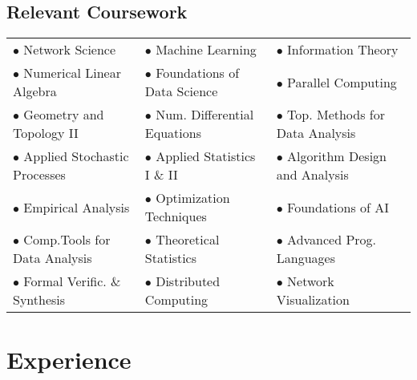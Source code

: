 \documentclass[11pt,a4paper,sans]{moderncv} %
\begin{document}
\subsection{Relevant Coursework}
\begin{center}
\begin{tabularx}{\linewidth}{ X X X }
 $\bullet$ Network Science &  $\bullet$ Machine Learning & $\bullet$ Information Theory  \\ 
  $\bullet$ Numerical Linear Algebra &  $\bullet$ Foundations of Data Science & $\bullet$ Parallel Computing  \\
   $\bullet$ Geometry and Topology II  &  $\bullet$ Num. Differential Equations & $\bullet$  Top. Methods for Data Analysis \\
 $\bullet$ Applied Stochastic Processes & $\bullet$ Applied Statistics I \& II  & $\bullet$ Algorithm Design and Analysis  \\
  $\bullet$ Empirical Analysis & $\bullet$ Optimization Techniques & $\bullet$ Foundations of AI  \\  
 $\bullet$ Comp.Tools for Data Analysis &  $\bullet$ Theoretical Statistics & $\bullet$ Advanced Prog. Languages\\
$\bullet$ Formal Verific. \& Synthesis & $\bullet$ Distributed Computing & $\bullet$ Network Visualization
\end{tabularx}
\end{center}





%


\section{Experience}
\end{document}
